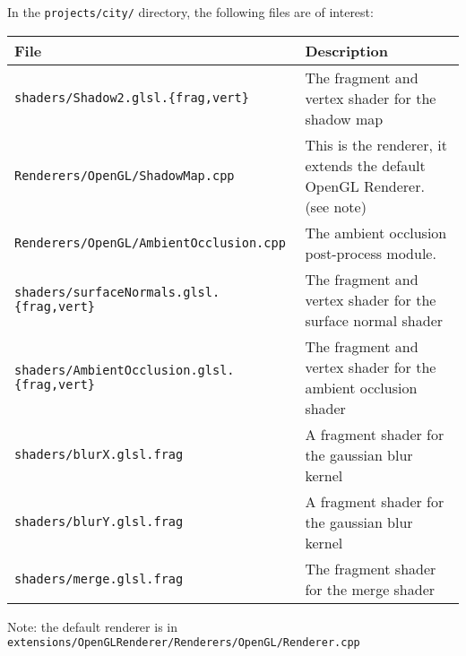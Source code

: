 In the \texttt{projects/city/} directory, the following files are of interest:

\begin{center} 
  \begin{tabular}{|l|p{5cm}|}
    \hline 
    \textbf{File} & \textbf{Description} \\ \hline 
    \texttt{shaders/Shadow2.glsl.\{frag,vert\}} 
    & The fragment and vertex shader for the shadow map \\ \hline
    \texttt{Renderers/OpenGL/ShadowMap.cpp} 
    & This is the renderer, it extends the default OpenGL Renderer. (see note) \\ \hline    
    \texttt{Renderers/OpenGL/AmbientOcclusion.cpp} 
    & The ambient occlusion post-process module. \\ \hline    
    \texttt{shaders/surfaceNormals.glsl.\{frag,vert\}} 
    & The fragment and vertex shader for the surface normal shader \\ \hline
    \texttt{shaders/AmbientOcclusion.glsl.\{frag,vert\}} 
    & The fragment and vertex shader for the ambient occlusion shader \\ \hline
    \texttt{shaders/blurX.glsl.frag} 
    & A fragment shader for the gaussian blur kernel \\ \hline
    \texttt{shaders/blurY.glsl.frag} 
    & A fragment shader for the gaussian blur kernel \\ \hline
    \texttt{shaders/merge.glsl.frag} 
    & The fragment shader for the merge shader \\ \hline
  \end{tabular}
\end{center}

Note: the default renderer is in \\
\texttt{extensions/OpenGLRenderer/Renderers/OpenGL/Renderer.cpp}


